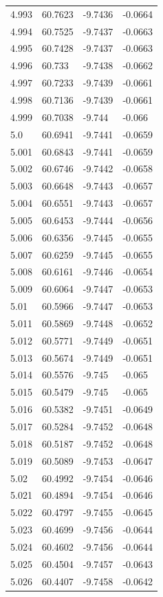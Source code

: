 \begin{tabular}{llll}
4.993 & 60.7623 & -9.7436 & -0.0664 \\
4.994 & 60.7525 & -9.7437 & -0.0663 \\
4.995 & 60.7428 & -9.7437 & -0.0663 \\
4.996 & 60.733 & -9.7438 & -0.0662 \\
4.997 & 60.7233 & -9.7439 & -0.0661 \\
4.998 & 60.7136 & -9.7439 & -0.0661 \\
4.999 & 60.7038 & -9.744 & -0.066 \\
5.0 & 60.6941 & -9.7441 & -0.0659 \\
5.001 & 60.6843 & -9.7441 & -0.0659 \\
5.002 & 60.6746 & -9.7442 & -0.0658 \\
5.003 & 60.6648 & -9.7443 & -0.0657 \\
5.004 & 60.6551 & -9.7443 & -0.0657 \\
5.005 & 60.6453 & -9.7444 & -0.0656 \\
5.006 & 60.6356 & -9.7445 & -0.0655 \\
5.007 & 60.6259 & -9.7445 & -0.0655 \\
5.008 & 60.6161 & -9.7446 & -0.0654 \\
5.009 & 60.6064 & -9.7447 & -0.0653 \\
5.01 & 60.5966 & -9.7447 & -0.0653 \\
5.011 & 60.5869 & -9.7448 & -0.0652 \\
5.012 & 60.5771 & -9.7449 & -0.0651 \\
5.013 & 60.5674 & -9.7449 & -0.0651 \\
5.014 & 60.5576 & -9.745 & -0.065 \\
5.015 & 60.5479 & -9.745 & -0.065 \\
5.016 & 60.5382 & -9.7451 & -0.0649 \\
5.017 & 60.5284 & -9.7452 & -0.0648 \\
5.018 & 60.5187 & -9.7452 & -0.0648 \\
5.019 & 60.5089 & -9.7453 & -0.0647 \\
5.02 & 60.4992 & -9.7454 & -0.0646 \\
5.021 & 60.4894 & -9.7454 & -0.0646 \\
5.022 & 60.4797 & -9.7455 & -0.0645 \\
5.023 & 60.4699 & -9.7456 & -0.0644 \\
5.024 & 60.4602 & -9.7456 & -0.0644 \\
5.025 & 60.4504 & -9.7457 & -0.0643 \\
5.026 & 60.4407 & -9.7458 & -0.0642 \\

\end{tabular}
